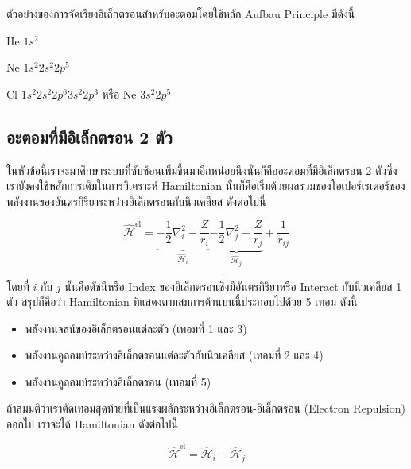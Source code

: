 ตัวอย่างของการจัดเรียงอิเล็กตรอนสำหรับอะตอมโดยใช้หลัก Aufbau Principle มีดังนี้

He $1s^{2}$

Ne $1s^{2} 2s^{2} 2p^{5}$

Cl $1s^{2} 2s^{2} 2p^{6} 3s^{2} 2p^{3}$ หรือ Ne $3s^{2} 2p^{5}$

\subsection{อะตอมที่มีอิเล็กตรอน 2 ตัว}

ในหัวข้อนี้เราจะมาศึกษาระบบที่ซับซ้อนเพิ่มขึ้นมาอีกหน่อยนึงนั่นก็คืออะตอมที่มีอิเล็กตรอน 2 ตัวซึ่งเรายังคงใช้หลักการเดิมในการวิเคราะห์ Hamiltonian
นั่นก็คือเริ่มด้วยผลรวมของโอเปอร์เรเตอร์ของพลังงานของอันตรกิริยาระหว่างอิเล็กตรอนกับนิวเคลียส ดังต่อไปนี้

\begin{equation}
    \hat{\mathscr{H}}^{\text{el}}
    =
    \underbrace
    {
        -\frac{1}{2} \nabla^{2}_{i}
        -\frac{Z}{r_{i}}
    }_
    {
        \hat{\mathscr{H}}_{i}
    }
    \underbrace
    {
        -\frac{1}{2} \nabla^{2}_{j}
        -\frac{Z}{r_{j}}
    }_
    {
        \hat{\mathscr{H}}_{j}
    }
    + \frac{1}{r_{ij}}
\end{equation}

\noindent โดยที่ $i$ กับ $j$ นั้นคือดัชนีหรือ Index ของอิเล็กตรอนซึ่งมีอันตรกิริยาหรือ Interact กับนิวเคลียส 1 ตัว สรุปก็คือว่า
Hamiltonian ที่แสดงตามสมการด้านบนนี้ประกอบไปด้วย 5 เทอม ดังนี้

\begin{itemize}[topsep=0pt,noitemsep]
    \setlength\itemsep{1em}
    \item พลังงานจลน์ของอิเล็กตรอนแต่ละตัว (เทอมที่ 1 และ 3)

    \item พลังงานคูลอมบ์ระหว่างอิเล็กตรอนแต่ละตัวกับนิวเคลียส (เทอมที่ 2 และ 4)

    \item พลังงานคูลอมบ์ระหว่างอิเล็กตรอน (เทอมที่ 5)
\end{itemize}

ถ้าสมมติว่าเราตัดเทอมสุดท้ายที่เป็นแรงผลักระหว่างอิเล็กตรอน-อิเล็กตรอน (Electron Repulsion) ออกไป เราจะได้ Hamiltonian ดังต่อไปนี้

\begin{equation}
    \label{eq:Hamiltonian_two_electrons}
    \hat{\mathscr{H}}^{\text{el}}
    =
    \hat{\mathscr{H}}_{i} + \hat{\mathscr{H}}_{j}
\end{equation}

